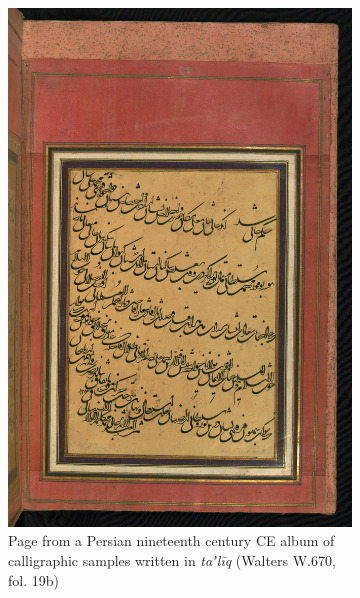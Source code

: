 \begin{figure}[h!tp]
        \centering
	\begin{subfigure}[t]{.48\columnwidth}
		\centering
                \includegraphics[height=0.43\textheight]{images/W670_000040_sap.jpg}
		\caption{Page from a Persian nineteenth century CE album of calligraphic samples written in \emph{taʼlīq} (Walters W.670, fol. 19b)}
                \label{fig:ara_taliq}
        \end{subfigure}
	\hfill
	\begin{subfigure}[t]{.48\columnwidth}
		\centering

\end{subfigure}
\end{figure}
